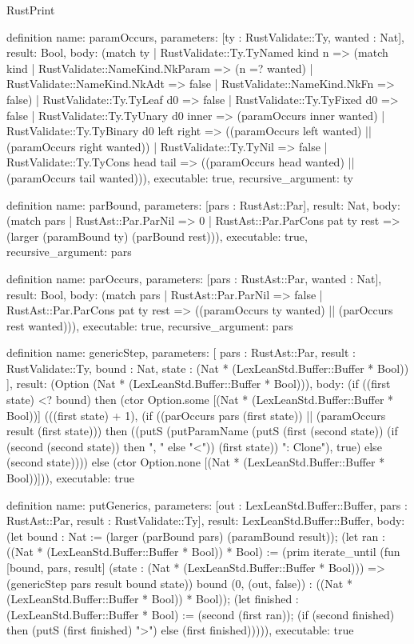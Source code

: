 \begin{lexlean}{RustPrint}
\begin{semanticmodule}
definition{
  name: paramOccurs,
  parameters: [ty : RustValidate::Ty, wanted : Nat],
  result: Bool,
  body: (match ty
    | RustValidate::Ty.TyNamed kind n => (match kind
      | RustValidate::NameKind.NkParam => (n =? wanted)
      | RustValidate::NameKind.NkAdt => false
      | RustValidate::NameKind.NkFn => false)
    | RustValidate::Ty.TyLeaf d0 => false
    | RustValidate::Ty.TyFixed d0 => false
    | RustValidate::Ty.TyUnary d0 inner => (paramOccurs inner wanted)
    | RustValidate::Ty.TyBinary d0 left right => ((paramOccurs left wanted) || (paramOccurs right wanted))
    | RustValidate::Ty.TyNil => false
    | RustValidate::Ty.TyCons head tail => ((paramOccurs head wanted) || (paramOccurs tail wanted))),
  executable: true,
  recursive_argument: ty
}

definition{
  name: parBound,
  parameters: [pars : RustAst::Par],
  result: Nat,
  body: (match pars
    | RustAst::Par.ParNil => 0
    | RustAst::Par.ParCons pat ty rest => (larger (paramBound ty) (parBound rest))),
  executable: true,
  recursive_argument: pars
}

definition{
  name: parOccurs,
  parameters: [pars : RustAst::Par, wanted : Nat],
  result: Bool,
  body: (match pars
    | RustAst::Par.ParNil => false
    | RustAst::Par.ParCons pat ty rest => ((paramOccurs ty wanted) || (parOccurs rest wanted))),
  executable: true,
  recursive_argument: pars
}

definition{
  name: genericStep,
  parameters: [
    pars : RustAst::Par,
    result : RustValidate::Ty,
    bound : Nat,
    state : (Nat * (LexLeanStd.Buffer::Buffer * Bool))
  ],
  result: (Option (Nat * (LexLeanStd.Buffer::Buffer * Bool))),
  body: (if ((first state) <? bound) then (ctor Option.some [(Nat * (LexLeanStd.Buffer::Buffer * Bool))] (((first state) + 1), (if ((parOccurs pars (first state)) || (paramOccurs result (first state))) then ((putS (putParamName (putS (first (second state)) (if (second (second state)) then ", " else "<")) (first state)) ": Clone"), true) else (second state)))) else (ctor Option.none [(Nat * (LexLeanStd.Buffer::Buffer * Bool))])),
  executable: true
}

definition{
  name: putGenerics,
  parameters: [out : LexLeanStd.Buffer::Buffer, pars : RustAst::Par, result : RustValidate::Ty],
  result: LexLeanStd.Buffer::Buffer,
  body: (let bound : Nat := (larger (parBound pars) (paramBound result)); (let ran : ((Nat * (LexLeanStd.Buffer::Buffer * Bool)) * Bool) := (prim iterate_until (fun [bound, pars, result] (state : (Nat * (LexLeanStd.Buffer::Buffer * Bool))) => (genericStep pars result bound state)) bound (0, (out, false)) : ((Nat * (LexLeanStd.Buffer::Buffer * Bool)) * Bool)); (let finished : (LexLeanStd.Buffer::Buffer * Bool) := (second (first ran)); (if (second finished) then (putS (first finished) ">") else (first finished))))),
  executable: true
}


\end{semanticmodule}
\end{lexlean}
